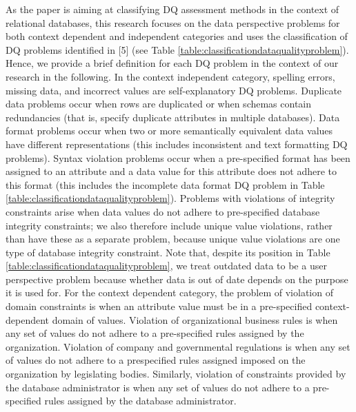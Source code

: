 \documentclass[pdftex,english,oribibl]{llncs}
\begin{document}
As the paper is aiming at classifying DQ assessment methods in the context of relational databases, this
 research focuses on the data perspective problems for both context dependent and independent categories and uses the classification of DQ problems identified in [5] (see Table \ref{table:classificationdataqualityproblem}).
 Hence, we provide a brief definition for each DQ problem in the context of our research in the following.
 In the context independent category, spelling errors, missing data, and incorrect values are self-explanatory DQ problems.
 Duplicate data problems occur when rows are duplicated or when schemas contain redundancies (that is, specify duplicate attributes in multiple databases).
 Data format problems occur when two or more semantically equivalent data values have different representations (this includes inconsistent and text formatting DQ problems).
 Syntax violation problems occur when a pre-specified format has been assigned to an attribute and a data value for this attribute does not adhere to this format (this includes the incomplete data format DQ problem in Table \ref{table:classificationdataqualityproblem}).
 Problems with violations of integrity constraints arise when data values do not adhere to pre-specified database integrity constraints; we also therefore include unique value violations, rather than have these as a separate problem, because unique value violations are one type of database integrity constraint.
 Note that, despite its position in Table \ref{table:classificationdataqualityproblem}, we treat outdated data to be a user perspective problem because whether data is out of date depends on the purpose it is used for.
 For the context dependent category, the problem of violation of domain constraints is when an attribute value must be in a pre-specified context-dependent domain of values.
 Violation of organizational business rules is when any set of values do not adhere to a pre-specified rules assigned by the organization.
 Violation of company and governmental regulations is when any set of values do not adhere to a prespecified rules assigned imposed on the organization by legislating bodies.
 Similarly, violation of constraints provided by the database administrator is when any set of values do not adhere to a pre-specified rules assigned by the database administrator.
\end{document}
